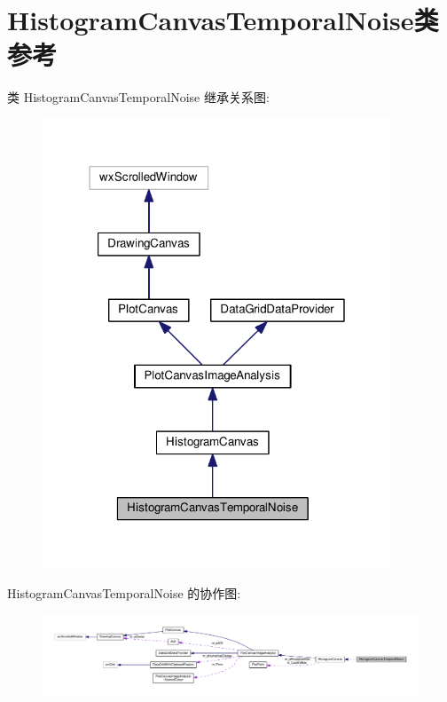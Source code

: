 \hypertarget{class_histogram_canvas_temporal_noise}{\section{Histogram\+Canvas\+Temporal\+Noise类 参考}
\label{class_histogram_canvas_temporal_noise}
}


类 Histogram\+Canvas\+Temporal\+Noise 继承关系图\+:
\nopagebreak
\begin{figure}[H]
\begin{center}
\leavevmode
\includegraphics[width=295pt]{class_histogram_canvas_temporal_noise__inherit__graph}
\end{center}
\end{figure}


Histogram\+Canvas\+Temporal\+Noise 的协作图\+:
\nopagebreak
\begin{figure}[H]
\begin{center}
\leavevmode
\includegraphics[width=350pt]{class_histogram_canvas_temporal_noise__coll__graph}
\end{center}
\end{figure}
